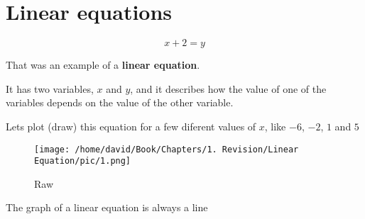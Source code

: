 \documentclass{article}
\begin{document}
\section{Linear equations}

\[
x + 2 = y 
\]


That was an example of a \textbf{linear equation}. 

It has two variables, $x$ and $y$, and it describes how the value of one of the variables depends on the value of the other variable.

Lets plot (draw) this equation for a few diferent values of $x$, like $-6$, $-2$, $1$ and $5$



\begin{figure}[l]
    \caption{Raw}
\texttt{[image: /home/david/Book/Chapters/1. Revision/Linear Equation/pic/1.png]}
\end{figure}

The graph of a linear equation is always a line 
\end{document}
